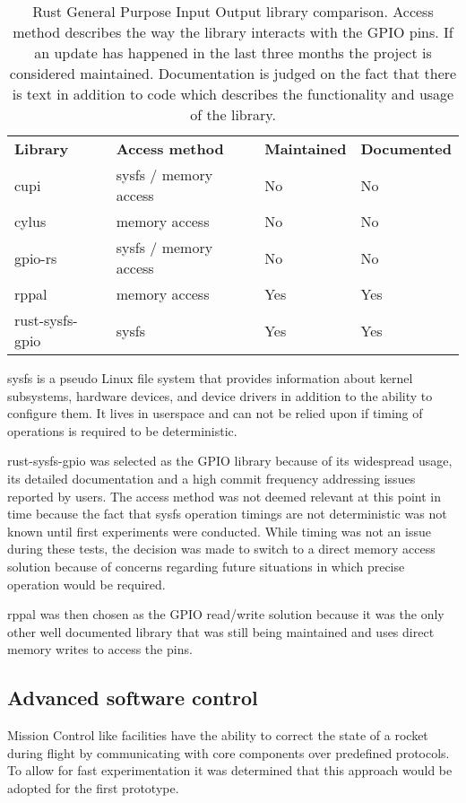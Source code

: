 \begin{table}[h]
\centering
\begin{tabular}{llll}
\textbf{Library} & \textbf{Access method} & \textbf{Maintained} & \textbf{Documented} \\
cupi             & sysfs / memory access  & No                  & No                  \\
cylus            & memory access          & No                  & No                  \\
gpio-rs          & sysfs / memory access  & No                  & No                  \\
rppal            & memory access          & Yes                 & Yes                 \\
rust-sysfs-gpio  & sysfs                  & Yes                 & Yes
\end{tabular}
\caption{Rust General Purpose Input Output library comparison. Access method describes the way the library interacts with the GPIO pins. If an update has happened in the last three months the project is considered maintained. Documentation is judged on the fact that there is text in addition to code which describes the functionality and usage of the library.}
\end{table}

sysfs is a pseudo Linux file system that provides information about kernel subsystems, hardware devices, and device drivers in addition to the ability to configure them. It lives in userspace and can not be relied upon if timing of operations is required to be deterministic. 

rust-sysfs-gpio \cite{rust-sysfs-gpio} was selected as the GPIO library because of its widespread usage, its detailed documentation and a high commit frequency addressing issues reported by users. The access method was not deemed relevant at this point in time because the fact that sysfs operation timings are not deterministic was not known until first experiments were conducted. While timing was not an issue during these tests, the decision was made to switch to a direct memory access solution because of concerns regarding future situations in which precise operation would be required. 

rppal \cite{rppal} was then chosen as the GPIO read/write solution because it was the only other well documented library that was still being maintained and uses direct memory writes to access the pins.


\subsection{Advanced software control}
Mission Control like facilities have the ability to correct the state of a rocket during flight by communicating with core components over predefined protocols. To allow for fast experimentation it was determined that this approach would be adopted for the first prototype.

